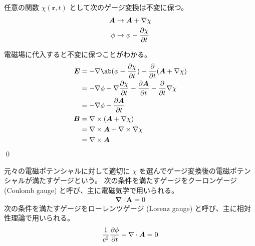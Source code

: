 \documentclass[uplatex,dvipdfmx,a4paper,11pt]{jlreq}
\makeatletter
\newcommand{\EE}{\bm{E}}
\newcommand{\BB}{\bm{B}}
\renewcommand{\AA}{\bm{A}}
\newcommand{\rr}{\bm{r}}
\newcommand{\vnabla}{\mathbf{\nabla}}
\numberwithin{equation}{section}
\theoremstyle{definition}
\renewenvironment{proof}[1][\proofname]{\par
  \normalfont
  \topsep6\p@\@plus6\p@ \trivlist
  \item[\hskip\labelsep{\bfseries #1}\@addpunct{\bfseries}]\ignorespaces\quad\par
}{%
  \qed\endtrivlist\@endpefalse
}
\renewcommand\proofname{証明}
\makeatother
\begin{document}
\begin{theorem}[ゲージ変換]
  任意の関数 $\chi(\rr, t)$ として次のゲージ変換は不変に保つ。
  \begin{align}
    \AA  & \to \AA + \vnabla\chi      \\
    \phi & \to \phi - \diffp{\chi}{t}
  \end{align}
\end{theorem}
\begin{proof}
  電磁場に代入すると不変に保つことがわかる。
  \begin{align}
    \EE & = - \vnabla\ab(\phi - \diffp{\chi}{t}) - \diffp{}{t}(\AA + \vnabla\chi)            \\
        & = - \vnabla\phi + \vnabla\diffp{\chi}{t} - \diffp{\AA}{t} - \diffp{}{t}\vnabla\chi \\
        & = - \vnabla\phi - \diffp{\AA}{t}                                                   \\
    \BB & = \vnabla\times(\AA + \vnabla\chi)                                                 \\
        & = \vnabla\times\AA + \vnabla\times\vnabla\chi                                      \\
        & = \vnabla\times\AA
  \end{align}
\end{proof}

\begin{definition}[ゲージ]
  元々の電磁ポテンシャルに対して適切に $\chi$ を選んでゲージ変換後の電磁ポテンシャルが満たすゲージという。
  次の条件を満たすゲージをクーロンゲージ (Coulomb gauge) と呼び、主に電磁気学で用いられる。
  \begin{align}
    \vnabla\cdot\AA = 0
  \end{align}
  次の条件を満たすゲージをローレンツゲージ (Lorenz gauge) と呼び、主に相対性理論で用いられる。
  \begin{align}
    \frac{1}{c^2}\diffp{\phi}{t} + \vnabla\cdot\AA = 0
  \end{align}
\end{definition}
\end{document}
